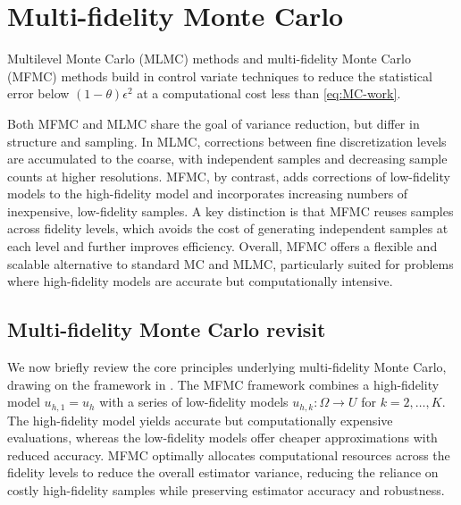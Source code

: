 

\section{Multi-fidelity Monte Carlo}\label{sec:MFMC}
%
Multilevel Monte Carlo (MLMC) methods \cite{MBGiles_2015a,SHeinrich_2001a} and 
multi-fidelity Monte Carlo (MFMC) methods  \cite{BPeherstorfer_KWillcox_MDGunzburger_2016a, BPeherstorfer_KWillcox_MDGunzburger_2018b} 
build in control variate techniques to reduce the statistical error below $(1-\theta)\epsilon^2$  
at a computational cost less than \eqref{eq:MC-work}.

Both MFMC and MLMC share the goal of variance reduction, but differ in structure and sampling.
In MLMC, corrections between fine discretization levels are accumulated to the coarse, 
with independent samples and decreasing sample counts at higher resolutions. 
MFMC, by contrast, adds corrections of low-fidelity models to the high-fidelity model and incorporates increasing numbers of inexpensive, low-fidelity samples. 
A key distinction is that MFMC reuses samples across fidelity levels, which avoids the cost of generating independent samples at each level and further improves efficiency. Overall, MFMC offers a flexible and scalable alternative to standard MC and MLMC, particularly suited for problems where high-fidelity models are accurate but computationally intensive.

\subsection{Multi-fidelity Monte Carlo revisit}
We now briefly review the core principles underlying multi-fidelity Monte Carlo, drawing on the framework in \cite{PeWiGu:2016}.  The MFMC framework combines a high-fidelity model $u_{h,1} = u_h$ with a series of low-fidelity models $u_{h,k}: \Omega \rightarrow U$ for $k=2,\ldots,K$.  The high-fidelity model yields accurate but computationally expensive evaluations, whereas the low-fidelity models offer cheaper approximations with reduced accuracy. MFMC optimally allocates computational resources across the fidelity levels to reduce the overall estimator variance, reducing the reliance on costly high-fidelity samples while preserving estimator accuracy and robustness.


